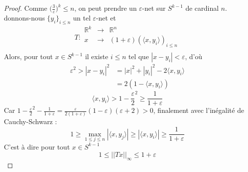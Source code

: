 \documentclass[12pt]{article}
\theoremstyle{definition}
\begin{document}
\begin{proof}
	Comme $\big(\frac{3}{\varepsilon}\big)^{k}\leq n$, on peut prendre un $\varepsilon$-net sur $S^{k-1}$ de cardinal $n$. donnons-nous $\{y_i\}_{i\leq n}$ un tel $\varepsilon$-net et 
	\begin{equation*}
	T : \begin{array}{ccc}
	\mathbb{R}^k& \to &\mathbb{R}^n\\
	x & \to & (1+\varepsilon)\left(\langle x,y_i\rangle\right)_{i\leq n}\\
	\end{array}
	\end{equation*}
	Alors, pour tout $x\in S^{k-1}$ il existe $i\leq n$ tel que $|x-y_i|<\varepsilon$, d'où 
	\begin{align*}
	\varepsilon^2>|x-y_i|^2&=|x|^2+|y_i|^2-2\langle x,y_i\rangle \\
	&=2(1-\langle x,y_i\rangle)
	\end{align*}
	\begin{equation*}
	\langle x,y_i\rangle >1 - \frac{\varepsilon}{2}^2 \geq \frac{1}{1+\varepsilon}
	\end{equation*}
	Car $1 - \frac{\varepsilon}{2}^2-\frac{1}{1+\varepsilon}=\frac{\varepsilon}{2(1+\varepsilon)}(1-\varepsilon)(\varepsilon+2)>0$, finalement avec l'inégalité de Cauchy-Schwarz : 
	\begin{equation*}
	1\geq  \max_{1\leq j \leq n}|\langle x,y_j\rangle| \geq  |\langle x,y_i\rangle| \geq \frac{1}{1+\varepsilon}
	\end{equation*}
	C'est à dire pour tout $x\in S^{k-1}$
	\begin{equation*}
	1\leq ||Tx||_\infty \leq 1+\varepsilon
	\end{equation*} 
\end{proof}
\appendix
\end{document}
